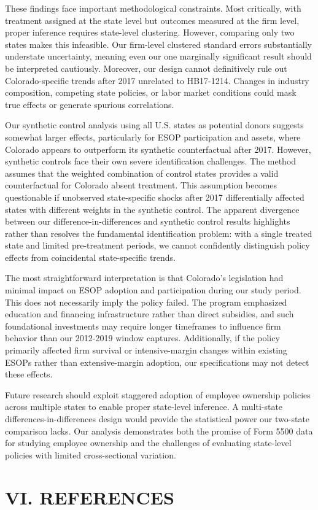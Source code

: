 \documentclass[12pt]{article}
\renewcommand{\normalsize}{\fontsize{12pt}{14pt}\selectfont}
\begin{document}
These findings face important methodological constraints. Most critically, with treatment assigned at the state level but outcomes measured at the firm level, proper inference requires state-level clustering. However, comparing only two states makes this infeasible. Our firm-level clustered standard errors substantially understate uncertainty, meaning even our one marginally significant result should be interpreted cautiously. Moreover, our design cannot definitively rule out Colorado-specific trends after 2017 unrelated to HB17-1214. Changes in industry composition, competing state policies, or labor market conditions could mask true effects or generate spurious correlations.

Our synthetic control analysis using all U.S. states as potential donors suggests somewhat larger effects, particularly for ESOP participation and assets, where Colorado appears to outperform its synthetic counterfactual after 2017. However, synthetic controls face their own severe identification challenges. The method assumes that the weighted combination of control states provides a valid counterfactual for Colorado absent treatment. This assumption becomes questionable if unobserved state-specific shocks after 2017 differentially affected states with different weights in the synthetic control. The apparent divergence between our difference-in-differences and synthetic control results highlights rather than resolves the fundamental identification problem: with a single treated state and limited pre-treatment periods, we cannot confidently distinguish policy effects from coincidental state-specific trends.

The most straightforward interpretation is that Colorado's legislation had minimal impact on ESOP adoption and participation during our study period. This does not necessarily imply the policy failed. The program emphasized education and financing infrastructure rather than direct subsidies, and such foundational investments may require longer timeframes to influence firm behavior than our 2012-2019 window captures. Additionally, if the policy primarily affected firm survival or intensive-margin changes within existing ESOPs rather than extensive-margin adoption, our specifications may not detect these effects.

Future research should exploit staggered adoption of employee ownership policies across multiple states to enable proper state-level inference. A multi-state differences-in-differences design would provide the statistical power our two-state comparison lacks. Our analysis demonstrates both the promise of Form 5500 data for studying employee ownership and the challenges of evaluating state-level policies with limited cross-sectional variation.

\section*{\centering \normalsize \textbf{VI. REFERENCES}}
\renewcommand{\bibsection}{}

\nocite{*}

\end{document}
